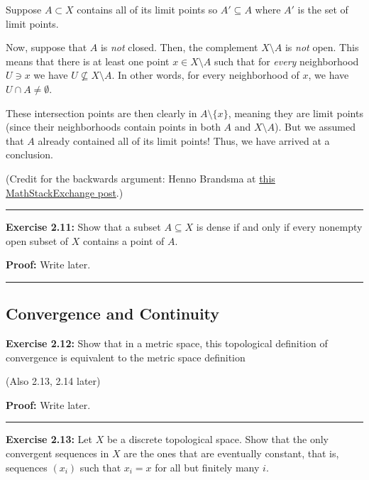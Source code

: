 \documentclass{article}
\begin{document}
\vskip 1cm

 Suppose $A \subset X$ contains all of its limit points so $A' \subseteq A$ where $A'$ is the set of limit points.

\vskip 0.25cm

Now, suppose that $A$ is \emph{not} closed. Then, the complement $X \setminus A$ is \emph{not} open. This means that there is at least one point $x \in X \setminus A$ such that for \emph{every} neighborhood $U \ni x$ we have $U \not\subseteq X \setminus A$. In other words, for every neighborhood of $x$, we have $U \cap A \neq \emptyset$. 

These intersection points are then clearly in $A \setminus \{x\}$, meaning they are limit points (since their neighborhoods contain points in both $A$ and $X \setminus A$). But we assumed that $A$ already contained all of its limit points! Thus, we have arrived at a conclusion. 

\vskip 0.5cm

(Credit for the backwards argument: Henno Brandsma at \href{https://math.stackexchange.com/questions/3672998/closed-subset-and-accumulation-points}{this MathStackExchange post}.)

\vskip 0.5cm
\hrule
\vskip 0.5cm

\textbf{Exercise 2.11:} Show that a subset $A \subseteq X$ is dense if and only if every nonempty open subset of $X$ contains a point of $A$.

\vskip 0.5cm

\textbf{Proof:} Write later.

\vskip 0.5cm
\hrule
\vskip 0.5cm

\subsection{Convergence and Continuity}

\textbf{Exercise 2.12:} Show that in a metric space, this topological definition of convergence is equivalent to the metric space definition

(Also 2.13, 2.14 later)

\vskip 0.5cm

\textbf{Proof:} Write later.

\vskip 0.5cm
\hrule
\vskip 0.5cm

\textbf{Exercise 2.13:} Let $X$ be a discrete topological space. Show that the only convergent sequences in $X$ are the ones that are eventually constant, that is, sequences $(x_i)$ such that
$x_i = x$ for all but finitely many $i$.
\end{document}
